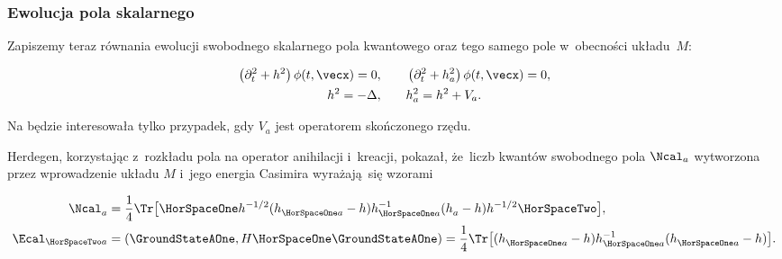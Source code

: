 \documentclass[10pt,t]{beamer}
\begin{document}
\begin{frame}
  \frametitle{Ewolucja pola skalarnego}


  Zapiszemy teraz równania ewolucji swobodnego skalarnego pola kwantowego
  oraz tego samego pole w~obecności układu~$M$:

  \vspace{-2em}


  \begin{subequations}

    \begin{align}
      \label{eq:Algebraiczne-podejscie-ETC-03}
      \left( \partial_{ t }^{ 2 } + h^{ 2 } \right) \phi( t, \vecx ) = 0, \qquad
      &\left( \partial_{ t }^{ 2 } + h_{ a }^{ 2 } \right) \phi( t, \vecx ) = 0, \\
      h^{ 2 } = -\Delta, \qquad
      &h_{ a }^{ 2 } = h^{ 2 } + V_{ a }.
    \end{align}

  \end{subequations}

  \vspace{-2em}



  Na będzie interesowała tylko przypadek, gdy $V_{ a }$ jest operatorem
  skończonego rzędu.

  Herdegen, korzystając z~rozkładu pola na operator anihilacji i~kreacji,
  pokazał, że~liczb kwantów  \alert{swobodnego} pola $\Ncal_{ a }$
  wytworzona przez wprowadzenie układu $M$ i~jego energia Casimira
  wyrażają~się wzorami

  \vspace{-1.8em}



  \begin{subequations}

    \begin{align}
      \label{eq:Algebraiczne-podejscie-ETC-04-A}
      \Ncal_{ a }^{ \vphantom{1} }
      &=
        \frac{ 1 }{ 4 } \Tr\big[ \HorSpaceOne h^{ -1/2 } (
        h_{ \HorSpaceOne a }^{ \vphantom{1} } - h )
        h_{ \HorSpaceOne a }^{ -1 }
        ( h_{ a }^{ \vphantom{1} } - h ) h^{ -1/2 } \HorSpaceTwo \big], \\
      \label{eq:Algebraiczne-podejscie-ETC-04-B}
      \Ecal_{ \HorSpaceTwo a }
      &=
        ( \GroundStateAOne, H \HorSpaceOne \GroundStateAOne ) =
        \frac{ 1 }{ 4 }
        \Tr\big[ ( h_{ \HorSpaceOne a }^{ \vphantom{1} } - h )
        h_{ \HorSpaceOne a }^{ -1 }
        ( h_{ \HorSpaceOne a }^{ \vphantom{1} } - h ) \big].
    \end{align}

  \end{subequations}

\end{frame}
\end{document}
